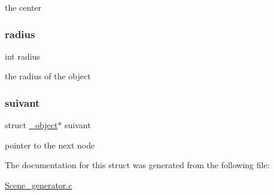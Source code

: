 the center \mbox{\label{struct__object_a395279899207ce7f17adf9fdb8ee97ee}} 
\subsubsection{\texorpdfstring{radius}{radius}}
{\footnotesize\ttfamily int radius}

the radius of the object \mbox{\label{struct__object_afb085435a094e9028d6ab3915166b2f3}} 
\subsubsection{\texorpdfstring{suivant}{suivant}}
{\footnotesize\ttfamily struct \hyperlink{struct__object}{\+\_\+object}$\ast$ suivant}

pointer to the next node 

The documentation for this struct was generated from the following file\+:\begin{DoxyCompactItemize}
\item 
\hyperlink{_scene__generator_8c}{Scene\+\_\+generator.\+c}\end{DoxyCompactItemize}
